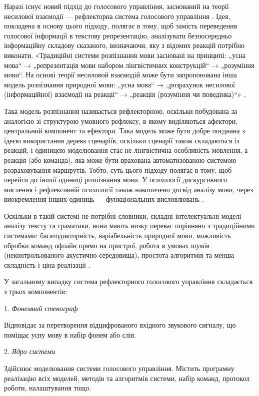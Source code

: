 Наразi існує новий підхід до голосового управління, заснований на теорії несилової взаємодії \cite{Teslia_2010} — рефлекторна система голосового управління \cite{Egorchenkov_2016}. Ідея, покладена в основу цього підходу, полягає в тому, щоб замість переведення голосової інформації в текстову репрезентацію, аналізувати безпосередньо інформаційну складову сказаного, визначаючи, яку з відомих реакцій потрібно виконати. «Традиційні системи розпізнання мови засновані на принципі: „усна мова“ → „репрезентація мови набором лінгвістичних конструкцій“ → „розуміння мови“. На основі теорії несиловой взаємодій може бути запропонована інша модель розпізнання природної мови: „усна мова“ → „розрахунок несилової (інформаційної) взаємодії на реакції“ → „реакція (розуміння чи поведінка)“» \cite{Teslia_2014}.

Така модель розпізнання називається рефлекторною, оскільки побудована за аналогією зі структурою умовного рефлексу, в якому виділяються афектори, центральний компонент та ефектори. Така модель може бути добре поєднана з ідеєю використання дерева сценаріїв, оскільки сценарії також складаються із реакцій, і одиницею моделювання стає не лінгвістична особливість мовлення, а реакція (або команда), яка може бути врахована автоматизованою системою розраховування маршрутів. Тобто, суть цього підходу полягає в тому, щоб перейти до іншої одиниці розпізнання мови. У психології дискурсивного мислення і рефлексивній психології також накопичено досвід аналізу мови, через виокремлення інших одиниць — функціональних висловлювань \cite{Naydonov_2008}.

Оскільки в такій системі не потрібні словники, складні інтелектуальні моделі аналізу тексту та граматики, вони мають низку переваг порівняно з традиційними системами: багатодикторність, варіабельність природної мови, можливість обробки команд офлайн прямо на пристрої, робота в умовах шумів (неконтрольованого акустично середовища), простота алгоритмів та менша складність і ціна реалізації \cite{Teslia_2013}.

У загальному випадку система рефлекторного голосового управління складається з трьох компонентів:

1. \textit{Фонемний стенограф}

Відповідає за перетворення відцифрованого вхідного звукового сигналу, що поміщає усну мову в набір фонем або слів.

2. \textit{Ядро системи}

Здійснює моделювання системи голосового управління. Містить програмну реалізацію всіх моделей, методів та алгоритмів системи, набір команд, протокол роботи, налаштування тощо.

